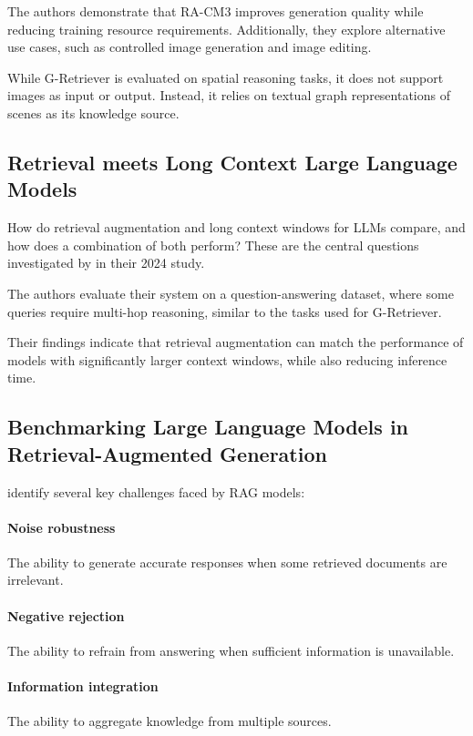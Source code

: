The authors demonstrate that RA-CM3 improves generation quality while reducing training resource requirements. Additionally, they explore alternative use cases, such as controlled image generation and image editing.

While G-Retriever is evaluated on spatial reasoning tasks, it does not support images as input or output. Instead, it relies on textual graph representations of scenes as its knowledge source.

\subsection{Retrieval meets Long Context Large Language Models}

How do retrieval augmentation and long context windows for LLMs compare, and how does a combination of both perform?
These are the central questions investigated by \citet{Xu2023RetrievalML} in their 2024 study.

The authors evaluate their system on a question-answering dataset, where some queries require multi-hop reasoning, similar to the tasks used for G-Retriever.

Their findings indicate that retrieval augmentation can match the performance of models with significantly larger context windows, while also reducing inference time.


\subsection{Benchmarking Large Language Models in Retrieval-Augmented Generation}

\citet{benchmarking} identify several key challenges faced by RAG models:

\paragraph{Noise robustness} The ability to generate accurate responses when some retrieved documents are irrelevant.
\paragraph{Negative rejection} The ability to refrain from answering when sufficient information is unavailable.
\paragraph{Information integration} The ability to aggregate knowledge from multiple sources.
